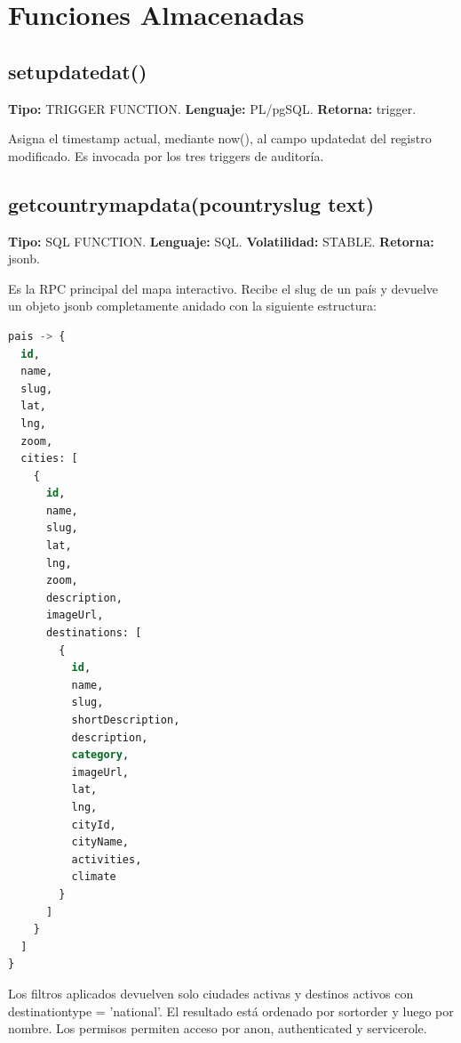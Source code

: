 \documentclass[12pt,letterpaper]{article}
\DeclareRobustCommand{\code}[1]{\texorpdfstring{\begingroup\ttfamily\footnotesize\def\_{\textunderscore\allowbreak}#1\endgroup}{#1}}
\begin{document}
\section{Funciones Almacenadas}

\subsection{\code{set\_updated\_at()}}

\begin{infobox}
\textbf{Tipo:} TRIGGER FUNCTION. \textbf{Lenguaje:} PL/pgSQL. \textbf{Retorna:} \code{trigger}.
\end{infobox}

Asigna el timestamp actual, mediante \code{now()}, al campo \code{updated\_at} del registro modificado. Es invocada por los tres triggers de auditoría.

\subsection{\code{get\_country\_map\_data(p\_country\_slug text)}}

\begin{infobox}
\textbf{Tipo:} SQL FUNCTION. \textbf{Lenguaje:} SQL. \textbf{Volatilidad:} STABLE. \textbf{Retorna:} \code{jsonb}.
\end{infobox}

Es la RPC principal del mapa interactivo. Recibe el slug de un país y devuelve un objeto \code{jsonb} completamente anidado con la siguiente estructura:

\begin{lstlisting}[language=sql]
pais -> {
  id,
  name,
  slug,
  lat,
  lng,
  zoom,
  cities: [
    {
      id,
      name,
      slug,
      lat,
      lng,
      zoom,
      description,
      imageUrl,
      destinations: [
        {
          id,
          name,
          slug,
          shortDescription,
          description,
          category,
          imageUrl,
          lat,
          lng,
          cityId,
          cityName,
          activities,
          climate
        }
      ]
    }
  ]
}
\end{lstlisting}

Los filtros aplicados devuelven solo ciudades activas y destinos activos con \code{destination\_type = 'national'}. El resultado está ordenado por \code{sort\_order} y luego por nombre. Los permisos permiten acceso por \code{anon}, \code{authenticated} y \code{service\_role}.
\end{document}
